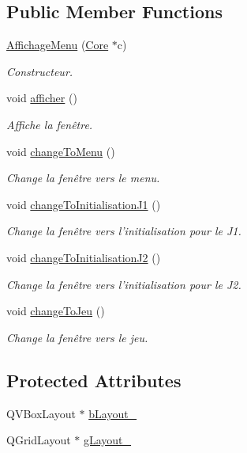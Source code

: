 \subsection*{Public Member Functions}
\begin{DoxyCompactItemize}
\item 
\hyperlink{classAffichageMenu_a68e70ec71422f3cb651299f08c85987e}{Affichage\+Menu} (\hyperlink{classCore}{Core} $\ast$c)
\begin{DoxyCompactList}\small\item\em Constructeur. \end{DoxyCompactList}\item 
void \hyperlink{classAffichageMenu_abec0adf6db92df26a937ff702a5a87fc}{afficher} ()
\begin{DoxyCompactList}\small\item\em Affiche la fenêtre. \end{DoxyCompactList}\item 
void \hyperlink{classAffichageMenu_a5f825906a1c5afccfbb03b007906bd28}{change\+To\+Menu} ()
\begin{DoxyCompactList}\small\item\em Change la fenêtre vers le menu. \end{DoxyCompactList}\item 
void \hyperlink{classAffichageMenu_ab7df249dc5db82d25613b80c28ba1ed4}{change\+To\+Initialisation\+J1} ()
\begin{DoxyCompactList}\small\item\em Change la fenêtre vers l'initialisation pour le J1. \end{DoxyCompactList}\item 
void \hyperlink{classAffichageMenu_a1980bc54a6156938cc3b737972facd32}{change\+To\+Initialisation\+J2} ()
\begin{DoxyCompactList}\small\item\em Change la fenêtre vers l'initialisation pour le J2. \end{DoxyCompactList}\item 
void \hyperlink{classAffichageMenu_a878a89a1ce7e138695e3e5fde5e020af}{change\+To\+Jeu} ()
\begin{DoxyCompactList}\small\item\em Change la fenêtre vers le jeu. \end{DoxyCompactList}\end{DoxyCompactItemize}
\subsection*{Protected Attributes}
\begin{DoxyCompactItemize}
\item 
Q\+V\+Box\+Layout $\ast$ \hyperlink{classAffichageMenu_a190c22c6af2b9d0f5f45b727a1f60838}{b\+Layout\+\_\+}
\item 
Q\+Grid\+Layout $\ast$ \hyperlink{classAffichageMenu_a33ee17880f8d6d985c19eebf0e5f121b}{g\+Layout\+\_\+}
\end{DoxyCompactItemize}



